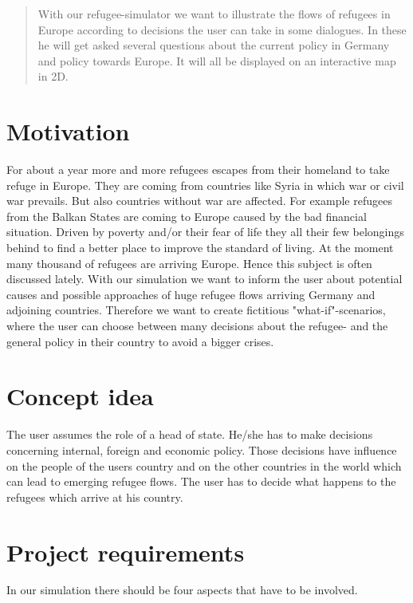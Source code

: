 \documentclass{acm_proc_article-sp}
\begin{document}
\begin{abstract}
With our refugee-simulator we want to illustrate the flows of refugees in Europe according to decisions the user can take in some dialogues. In these he will get asked several questions about the current policy in Germany and policy towards Europe. It will all be displayed on an interactive map in 2D.

\end{abstract}

\section{Motivation}
For about a year more and more refugees escapes from their homeland to take refuge in Europe. They are coming from countries like Syria in which war or civil war prevails. But also countries without war are affected. For example refugees from the Balkan States are coming to Europe caused by the bad financial situation. Driven by poverty and/or their fear of life they all their few belongings behind to find a better place to improve the standard of living. At the moment many thousand of refugees are arriving Europe. Hence this subject is often discussed lately. With our simulation we want to inform the user about potential causes and possible approaches of huge refugee flows arriving Germany and adjoining countries. Therefore we want to create fictitious "what-if"-scenarios, where the user can choose between many decisions about the refugee- and the general policy in their country to avoid a bigger crises.


%

\section{Concept idea}
\label{concept idea}
The user assumes the role of a head of state. He/she has to make decisions concerning internal, foreign and economic policy. Those decisions have influence on the people of the users country  and on the other countries in the world which can lead to emerging refugee flows. The user has to decide what happens to the refugees which arrive at his country. 

\section{Project requirements}
In our simulation there should be four aspects that have to be involved.
\end{document}
